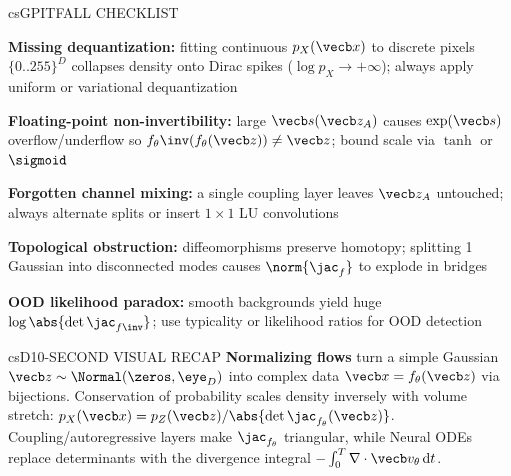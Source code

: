 \documentclass[../../../../master.tex]{subfiles}
\begin{document}
\begin{cscolumns}
\begin{cscard}{csG}{PITFALL CHECKLIST}
  \begin{csbul}
    \item \textbf{Missing dequantization:} fitting continuous $p_X(\vecb x)$ to discrete pixels $\{0..255\}^D$ collapses density onto Dirac spikes ($\log p_X\to+\infty$); always apply uniform or variational dequantization
    \item \textbf{Floating-point non-invertibility:} large $\vecb s(\vecb z_A)$ causes $\exp(\vecb s)$ overflow/underflow so $f_\theta\inv(f_\theta(\vecb z))\ne\vecb z$; bound scale via $\tanh$ or $\sigmoid$
    \item \textbf{Forgotten channel mixing:} a single coupling layer leaves $\vecb z_A$ untouched; always alternate splits or insert $1\times 1$ LU convolutions
    \item \textbf{Topological obstruction:} diffeomorphisms preserve homotopy; splitting 1 Gaussian into disconnected modes causes $\norm{\jac_f}$ to explode in bridges
    \item \textbf{OOD likelihood paradox:} smooth backgrounds yield huge $\log\abs{\det\jac_{f\inv}}$; use typicality or likelihood ratios for OOD detection
  \end{csbul}
\end{cscard}

\begin{cscard}{csD}{10-SECOND VISUAL RECAP}
  \sffamily\footnotesize
  \textbf{Normalizing flows} turn a simple Gaussian $\vecb z\sim\Normal(\zeros,\eye_D)$ into complex data $\vecb x=f_\theta(\vecb z)$ via bijections.
  Conservation of probability scales density inversely with volume stretch: $p_X(\vecb x)=p_Z(\vecb z)/\abs{\det\jac_{f_\theta}(\vecb z)}$.
  Coupling/autoregressive layers make $\jac_{f_\theta}$ triangular, while Neural ODEs replace determinants with the divergence integral $-\int_0^T\nabla\cdot\vecb v_\theta\,\mathrm{d}t$.
\end{cscard}
\end{cscolumns}

\csend
\end{document}
